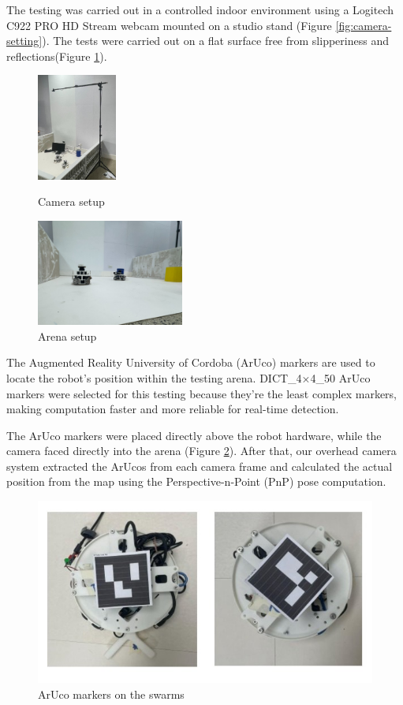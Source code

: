 The testing was carried out in a controlled indoor environment using a Logitech C922 PRO HD Stream webcam mounted on a studio stand (Figure \ref{fig:camera-setting}). The tests were carried out on a flat surface free from slipperiness and reflections(Figure \ref{fig:arena-setting}). 
\begin{figure}[!htb]
    \centering
    \begin{minipage}{0.48\textwidth}
        \centering
        \includegraphics[height=3.5cm]{assets/images/odometry/cam_setting.jpg}
        \caption{Camera setup}
        \label{fig:camera-setting}
    \end{minipage}\hfill
    \begin{minipage}{0.48\textwidth}
        \centering
        \includegraphics[height=3.5cm]{assets/images/odometry/arena_setting.jpg}
        \caption{Arena setup}
        \label{fig:arena-setting}
    \end{minipage}
\end{figure}

The Augmented Reality University of Cordoba (ArUco) markers are used to locate the robot's position within the testing arena. DICT\_4×4\_50 ArUco markers were selected for this testing because they're the least complex markers, making computation faster and more reliable for real-time detection. 

The ArUco markers were placed directly above the robot hardware, while the camera faced directly into the arena (Figure \ref{fig:aruco-swarm}). After that, our overhead camera system extracted the ArUcos from each camera frame and calculated the actual position from the map using the Perspective-n-Point (PnP) pose computation.

\begin{figure}[H]
    \centering
    \includegraphics[width=0.35\linewidth]{assets/images/odometry/aruco.jpg}
    \caption{ArUco markers on the swarms}
    \label{fig:aruco-swarm}
\end{figure}

